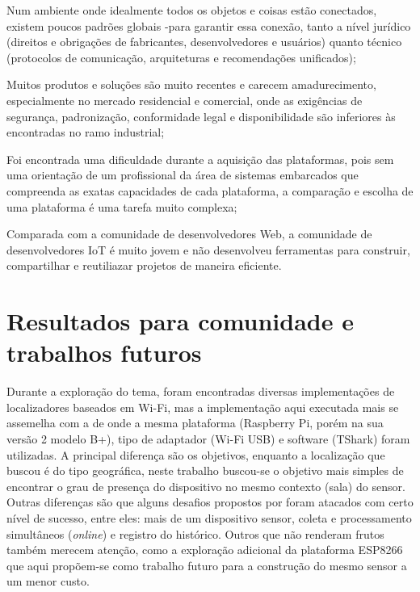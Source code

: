 \begin{alineas}
	\item Num ambiente onde
	idealmente todos os objetos e coisas estão conectados, existem poucos padrões globais
	-para garantir essa conexão, tanto a nível jurídico (direitos e
	obrigações de fabricantes, desenvolvedores e usuários) quanto técnico
	(protocolos de comunicação, arquiteturas e recomendações unificados);

	\item Muitos produtos e soluções são muito recentes e carecem amadurecimento,
	especialmente no mercado residencial e comercial, onde as exigências de
	segurança, padronização, conformidade legal e disponibilidade são inferiores
	às encontradas no ramo industrial;

	\item Foi encontrada uma dificuldade durante a aquisição das plataformas, pois
	sem uma orientação de um profissional da área de sistemas embarcados que compreenda as exatas capacidades de cada plataforma, a
	comparação e escolha de uma plataforma é uma tarefa muito complexa;

	\item Comparada com a comunidade de desenvolvedores Web, a comunidade
	de desenvolvedores IoT é muito jovem e não desenvolveu ferramentas para
	construir, compartilhar e reutiliazar projetos de maneira eficiente.
\end{alineas}


\section{Resultados para comunidade e trabalhos futuros}
\label{sec:trab-futuros}

Durante a exploração do tema, foram encontradas diversas implementações de
localizadores baseados em Wi-Fi, mas a implementação aqui executada mais se
assemelha com a de  onde a mesma plataforma
(Raspberry Pi, porém na sua versão 2 modelo B+), tipo de adaptador (Wi-Fi USB)
e software (TShark) foram utilizadas. A principal diferença são os
objetivos, enquanto a localização que  buscou é do tipo
geográfica, neste trabalho buscou-se o objetivo mais simples de encontrar o grau
de presença do dispositivo no mesmo contexto (sala) do sensor. Outras diferenças
são que alguns desafios propostos por  foram atacados
com certo nível de sucesso, entre eles: mais de um dispositivo sensor,
coleta e processamento simultâneos (\emph{online}) e registro do histórico.
Outros que não renderam frutos também merecem atenção, como a exploração
adicional da plataforma ESP8266 que aqui propõem-se como trabalho futuro para a
construção do mesmo sensor a um menor custo.
